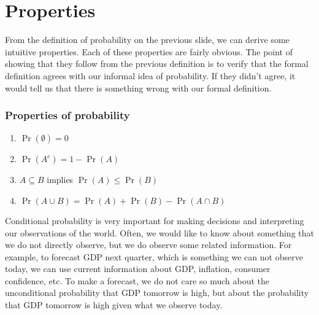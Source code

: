 \section{Properties}
    
From the definition of probability on the previous slide, we can
derive some intuitive properties. Each of these properties are fairly
obvious. The point of showing that they follow from the previous
definition is to verify that the formal definition agrees with our
informal idea of probability. If they didn't agree, it would tell us
that there is something wrong with our formal definition.

\begin{frame}[allowframebreaks]\frametitle{Properties of probability}
  \begin{enumerate}
  \item $\Pr(\emptyset) = 0$ 
  \item $\Pr(A^c ) = 1 - \Pr(A)$
  \item $A \subseteq B$ implies $\Pr(A) \leq \Pr(B)$
  \item $\Pr(A \cup B) = \Pr(A) + \Pr(B) - \Pr(A \cap B)$ 
  \end{enumerate}
\end{frame}

Conditional probability is very important for making decisions and
interpreting our observations of the world. Often, we would like to
know about something that we do not directly observe, but we do
observe some related information. For example, to forecast GDP next
quarter, which is something we can not observe today, we can use
current information about GDP, inflation, consumer confidence, etc. To
make a forecast, we do not care so much about the unconditional
probability that GDP tomorrow is high, but about the probability that
GDP tomorrow is high given what we observe today.

